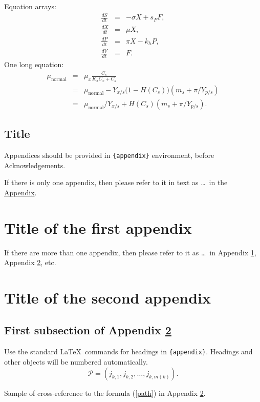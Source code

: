 \documentclass[aap]{imsart}
\theoremstyle{plain}
\theoremstyle{definition}
\begin{document}
Equation arrays:
\begin{eqnarray}
  \frac{dS}{dt} & = & - \sigma X + s_{F} F,\\
  \frac{dX}{dt} & = &   \mu    X,\\
  \frac{dP}{dt} & = &   \pi    X - k_{h} P,\\
  \frac{dV}{dt} & = &   F.
\end{eqnarray}
One long equation:
\begin{eqnarray}
 \mu_{\text{normal}} & = & \mu_{x} \frac{C_{s}}{K_{x}C_{x}+C_{s}}  \nonumber\\
                     & = & \mu_{\text{normal}} - Y_{x/s}\bigl(1-H(C_{s})\bigr)(m_{s}+\pi /Y_{p/s})\\
                     & = & \mu_{\text{normal}}/Y_{x/s}+ H(C_{s}) (m_{s}+ \pi /Y_{p/s}).\nonumber
\end{eqnarray}
\begin{appendix}
\section*{Title}\label{appn} %
Appendices should be provided in \verb|{appendix}| environment,
before Acknowledgements.

If there is only one appendix,
then please refer to it in text as \ldots\ in the \hyperref[appn]{Appendix}.
\end{appendix}
\begin{appendix}
\section{Title of the first appendix}\label{appA}
If there are more than one appendix, then please refer to it
as \ldots\ in Appendix \ref{appA}, Appendix \ref{appB}, etc.

\section{Title of the second appendix}\label{appB}
\subsection{First subsection of Appendix \protect\ref{appB}}

Use the standard \LaTeX\ commands for headings in \verb|{appendix}|.
Headings and other objects will be numbered automatically.
\begin{equation}
\mathcal{P}=(j_{k,1},j_{k,2},\dots,j_{k,m(k)}). \label{path}
\end{equation}

Sample of cross-reference to the formula (\ref{path}) in Appendix \ref{appB}.
\end{appendix}
\end{document}
